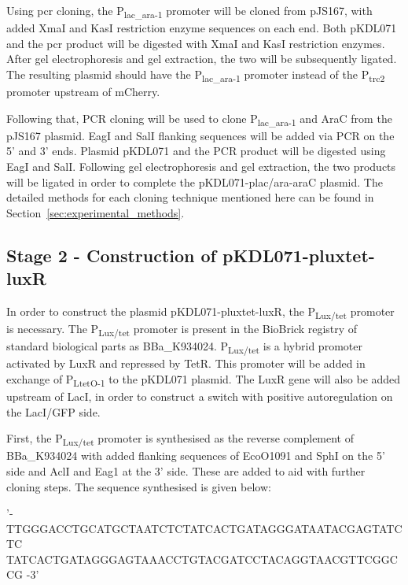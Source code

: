 Using \acrshort{pcr} cloning, the P\textsubscript{lac\_ara-1} promoter will be cloned from pJS167, with added XmaI and KasI  restriction enzyme sequences on each end. Both pKDL071 and the \acrshort{pcr} product will be digested with XmaI and KasI restriction enzymes. After gel electrophoresis and gel extraction, the two will be subsequently ligated. The resulting plasmid should have the P\textsubscript{lac\_ara-1} promoter instead of the P\textsubscript{trc2} promoter upstream of mCherry.


Following that, PCR cloning will be used to clone  P\textsubscript{lac\_ara-1} and AraC from the pJS167 plasmid. EagI and SalI flanking sequences will be added via PCR on the 5' and 3' ends. Plasmid pKDL071 and the PCR product will be digested using EagI and SalI. Following gel electrophoresis and gel extraction, the two products will be ligated in order to complete the pKDL071-plac/ara-araC plasmid. The detailed methods for each cloning technique mentioned here can be found in Section~\ref{sec:experimental_methods}.


\subsection{Stage 2 - Construction of pKDL071-pluxtet-luxR}
\label{sec:stage2}


In order to construct the plasmid pKDL071-pluxtet-luxR, the P\textsubscript{Lux/tet} promoter is necessary. The P\textsubscript{Lux/tet} promoter is present in the BioBrick registry of standard biological parts as BBa\_K934024. P\textsubscript{Lux/tet} is a hybrid promoter activated by LuxR and repressed by TetR. This promoter will be added in exchange of P\textsubscript{LtetO-1} to the pKDL071 plasmid. The LuxR gene will also be added upstream of LacI, in order to construct a switch with positive autoregulation on the LacI/GFP side. 

First, the P\textsubscript{Lux/tet} promoter is synthesised as the reverse complement of BBa\_K934024 with added flanking sequences of EcoO1091 and SphI on the 5' side and AclI and Eag1 at the 3' side. These are added to aid with further cloning steps. The sequence synthesised is given below:

\vspace{3 mm}
'- TTGGGACCTGCATGCTAATCTCTATCACTGATAGGGATAATACGAGTATCTC\\TATCACTGATAGGGAGTAAACCTGTACGATCCTACAGGTAACGTTCGGCCG -3'
\vspace{3 mm}

